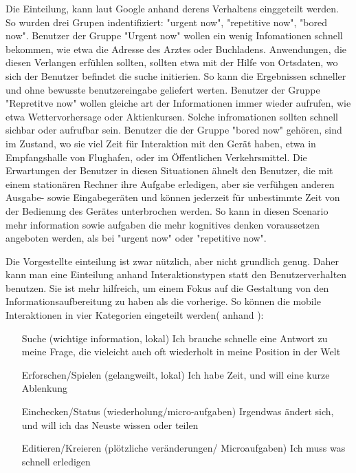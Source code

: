 Die Einteilung, kann laut Google anhand derens Verhaltens einggeteilt werden. So wurden drei Grupen indentifiziert: "urgent now", "repetitive now", "bored now"\cite{googleUsers}. Benutzer der Gruppe "Urgent now" wollen ein wenig Infomationen schnell bekommen, wie etwa die Adresse des Arztes oder Buchladens. Anwendungen, die diesen Verlangen erfühlen sollten, sollten etwa mit der Hilfe von Ortsdaten, wo sich der Benutzer befindet die suche initierien. So kann die Ergebnissen schneller und ohne bewusste benutzereingabe geliefert werten. Benutzer der Gruppe "Repretitve now" wollen gleiche art der Informationen immer wieder aufrufen, wie etwa Wettervorhersage oder Aktienkursen. Solche infromationen sollten schnell sichbar oder aufrufbar sein. Benutzer die der Gruppe "bored now" gehören, sind im Zustand, wo sie viel Zeit für Interaktion mit den Gerät haben, etwa in Empfangshalle von Flughafen, oder im Öffentlichen Verkehrsmittel. Die Erwartungen der Benutzer in diesen Situationen ähnelt den Benutzer, die mit einem stationären Rechner ihre Aufgabe erledigen, aber sie verfühgen anderen Ausgabe- sowie Eingabegeräten und können jederzeit für unbestimmte Zeit von der Bedienung des Gerätes unterbrochen werden. So kann in diesen Scenario mehr information sowie aufgaben die mehr kognitives denken voraussetzen angeboten werden, als bei "urgent now" oder "repetitive now".

Die Vorgestellte einteilung ist zwar nützlich, aber nicht grundlich genug. Daher kann man eine Einteilung anhand Interaktionstypen statt den Benutzerverhalten benutzen. Sie ist mehr hilfreich, um einem Fokus auf die Gestaltung von den Informationsaufbereitung zu haben als die vorherige. So können die mobile Interaktionen in vier Kategorien eingeteilt werden( anhand \cite[Seite 50]{mobileFirst}):

\begin{itemize}
 	\item[Suche (wichtige information, lokal)] Ich brauche schnelle eine Antwort zu meine Frage, die vieleicht auch oft wiederholt in meine Position in der Welt
 	\item[Erforschen/Spielen (gelangweilt, lokal)] Ich habe Zeit, und will eine kurze Ablenkung
 	\item[Einchecken/Status (wiederholung/micro-aufgaben)] Irgendwas ändert sich, und will ich das Neuste wissen oder teilen
 	\item[Editieren/Kreieren (plötzliche veränderungen/ Microaufgaben)] Ich muss was schnell erledigen
 \end{itemize} 

